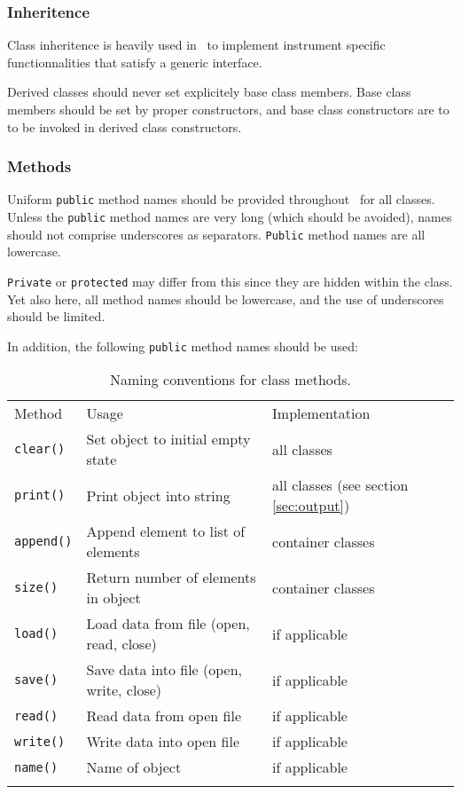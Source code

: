 \documentclass{article}[12pt,a4]
\begin{document}
\subsubsection{Inheritence}

Class inheritence is heavily used in \this\ to implement instrument specific functionnalities
that satisfy a generic interface.

Derived classes should never set explicitely base class members.
Base class members should be set by proper constructors, and base class constructors are
to to be invoked in derived class constructors.



\subsubsection{Methods}

Uniform {\tt public} method names should be provided throughout \this\ for all classes.
Unless the {\tt public} method names are very long (which should be avoided), names
should not comprise underscores as separators.
{\tt Public} method names are all lowercase.

{\tt Private} or {\tt protected} may differ from this since they are hidden within the class.
Yet also here, all method names should be lowercase, and the use of underscores
should be limited.
 
In addition, the following {\tt public} method names should be used:

\begin{table}[!h]
\caption{Naming conventions for class methods.
\label{tab:naming}}
\begin{center}
\begin{tabular}{lll}
\hline
\hline
\noalign{\smallskip}
Method & Usage & Implementation \\
\noalign{\smallskip}
\hline
\noalign{\smallskip}
{\tt clear()} & Set object to initial empty state & all classes \\
{\tt print()} & Print object into string & all classes (see section \ref{sec:output}) \\
{\tt append()} & Append element to list of elements & container classes \\
{\tt size()} & Return number of elements in object & container classes \\
{\tt load()} & Load data from file (open, read, close) & if applicable \\
{\tt save()} & Save data into file (open, write, close) & if applicable \\
{\tt read()} & Read data from open file & if applicable \\
{\tt write()} & Write data into open file & if applicable \\
{\tt name()} & Name of object & if applicable \\
\noalign{\smallskip}
\hline
\end{tabular}
\end{center}
\end{table}
\end{document}
